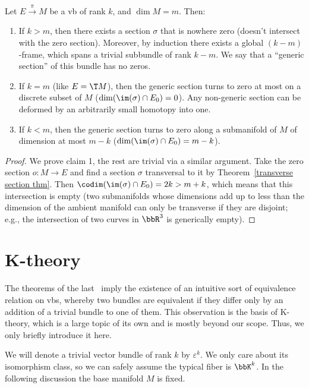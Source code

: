 \begin{cor}
Let $E\overset{\pi}{\to} M$ be a \gls{vb} of rank $k$, and $\dim M=m$. Then:
\begin{enumerate}
    \item If $k>m$, then there exists a section $\sigma$ that is nowhere zero (doesn't intersect with the zero section). Moreover, by induction there exists a global $(k-m)$-frame, which spans a trivial subbundle of rank $k-m$. We say that a ``generic section'' of this bundle has no zeros.
    \item If $k=m$ (like $E=\T M$), then the generic section turns to zero at most on a discrete subset of $M$ ($\dim(\im(\sigma)\cap E_0)=0$). Any non-generic section can be deformed by an arbitrarily small homotopy into one.
    \item If $k<m$, then the generic section turns to zero along a submanifold of $M$ of dimension at most $m-k$ ($\dim(\im(\sigma)\cap E_0)=m-k$). 
\end{enumerate}
\end{cor}
\begin{proof}
    We prove claim 1, the rest are trivial via a similar argument. Take the zero section $o:M\to E$ and find a   section $\sigma$ transversal to it by Theorem~\ref{transverse section thm}. Then $\codim(\im (\sigma)\cap E_0)=2k>m+k$, which means that this intersection is empty (two submanifolds whose dimensions add up to less than the dimension of the ambient manifold can only be transverse if they are disjoint; e.g., the intersection of two curves in $\bbR^3$ is generically empty).
\end{proof}






\section{K-theory}

The theorems of the last \sect\ imply the existence of an intuitive sort of equivalence relation on \glspl{vb}, whereby two bundles are equivalent if they differ only by an addition of a trivial bundle to one of them. This observation is the basis of K-theory, which is a large topic of its own and is mostly beyond our scope. Thus, we only briefly introduce it here.

We will denote a trivial vector bundle of rank $k$ by $\varepsilon^k$. We only care about its isomorphism class, so we can safely assume the typical fiber is $\bbK^k$. In the following discussion the base manifold $M$ is fixed.

